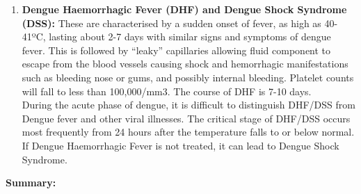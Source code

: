 \documentclass[11pt]{exam}
\begin{document}
\begin{questions}
\begin{enumerate}
\item \textbf{Dengue Haemorrhagic Fever (DHF) and Dengue Shock Syndrome (DSS):} These are
characterised by a sudden onset of fever, as high as 40-41ºC, lasting about
2-7 days with similar signs and symptoms of dengue fever. This is followed by
“leaky” capillaries allowing fluid component to escape from the blood vessels
causing shock and hemorrhagic manifestations such as bleeding nose or gums,
and possibly internal bleeding. Platelet counts will fall to less than 100,000/mm3.
The course of DHF is 7-10 days.\\
During the acute phase of dengue, it is difficult to distinguish DHF/DSS from
Dengue fever and other viral illnesses. The critical stage of DHF/DSS occurs most
frequently from 24 hours after the temperature falls to or below normal. If Dengue
Haemorrhagic Fever is not treated, it can lead to Dengue Shock Syndrome.\\
\end{enumerate}
\textbf{Summary:} \\
\\ \\


\end{questions}
\end{document}
